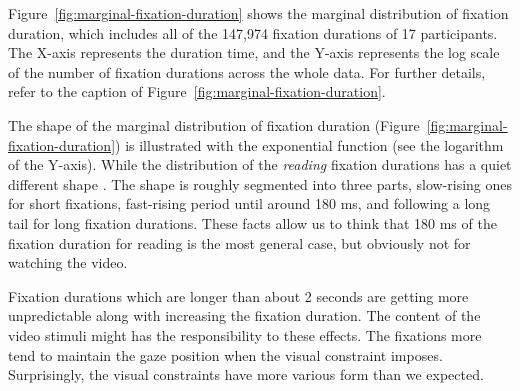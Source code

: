 \documentclass[10pt,letterpaper]{article}
\begin{document}
Figure~\ref{fig:marginal-fixation-duration} shows the marginal distribution of fixation duration, which includes all of the 147,974 fixation durations of 17 participants. The X-axis represents the duration time, and the Y-axis represents the log scale of the number of fixation durations across the whole data. For further details, refer to the caption of Figure~\ref{fig:marginal-fixation-duration}.

The shape of the marginal distribution of fixation duration (Figure~\ref{fig:marginal-fixation-duration}) is illustrated with the exponential function (see the logarithm of the Y-axis). While the distribution of the \textit{reading} fixation durations has a quiet different shape \cite{Feng2006}. The shape is roughly segmented into three parts, slow-rising ones for short fixations, fast-rising period until around 180 ms, and following a long tail for long fixation durations. These facts allow us to think that 180 ms of the fixation duration for reading is the most general case, but obviously not for watching the video.

Fixation durations which are longer than about 2 seconds are getting more unpredictable along with increasing the fixation duration. The content of the video stimuli might has the responsibility to these effects. The fixations more tend to maintain the gaze position when the visual constraint imposes. Surprisingly, the visual constraints have more various form than we expected.
\end{document}
